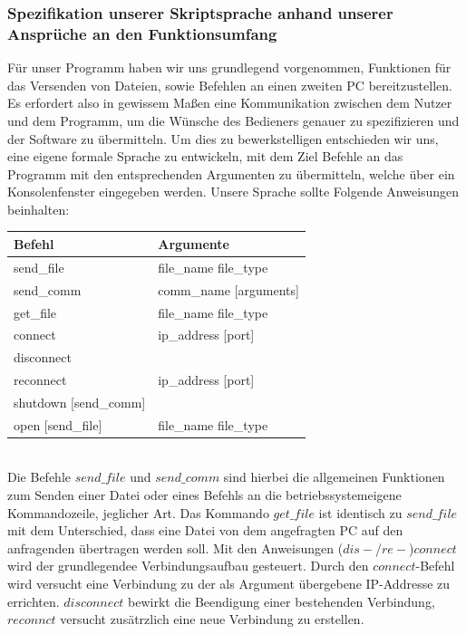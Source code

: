 \subsubsection{Spezifikation unserer Skriptsprache anhand unserer Ansprüche an den Funktionsumfang}
Für unser Programm haben wir uns grundlegend vorgenommen, Funktionen für das Versenden von Dateien, sowie Befehlen an einen zweiten PC bereitzustellen. Es erfordert also in gewissem Maßen eine Kommunikation zwischen dem Nutzer und dem Programm, um die Wünsche des Bedieners genauer zu spezifizieren und der Software zu übermitteln. Um dies zu bewerkstelligen entschieden wir uns, eine eigene formale Sprache zu entwickeln, mit dem Ziel Befehle an das Programm mit den entsprechenden Argumenten zu übermitteln, welche über ein Konsolenfenster eingegeben werden.
Unsere Sprache sollte Folgende Anweisungen beinhalten:\\
\begin{table}[h!]
\centering
\begin{tabular}{|ll|}
\hline
Befehl & Argumente \\ \hline
send\_file & file\_name file\_type \\
send\_comm & comm\_name {[}arguments{]} \\
get\_file & file\_name file\_type \\
connect & ip\_address [port]\\
disconnect & \\
reconnect & ip\_address [port]\\
shutdown [send\_comm] & \\
open [send\_file] & file\_name file\_type \\ \hline
\end{tabular}
\end{table}\\
Die Befehle $send\_file$ und $send\_comm$ sind hierbei die allgemeinen Funktionen zum Senden einer Datei oder eines Befehls an die betriebssystemeigene Kommandozeile, jeglicher Art. Das Kommando $get\_file$ ist identisch zu $send\_file$ mit dem Unterschied, dass eine Datei von dem angefragten PC auf den anfragenden übertragen werden soll. Mit den Anweisungen ($dis-$/$re-$)$connect$ wird der grundlegendee Verbindungsaufbau gesteuert. Durch den $connect$-Befehl wird versucht eine Verbindung zu der als Argument übergebene IP-Addresse zu errichten. $disconnect$ bewirkt die Beendigung einer bestehenden Verbindung, $reconnct$ versucht zusätrzlich eine neue Verbindung zu erstellen. 
